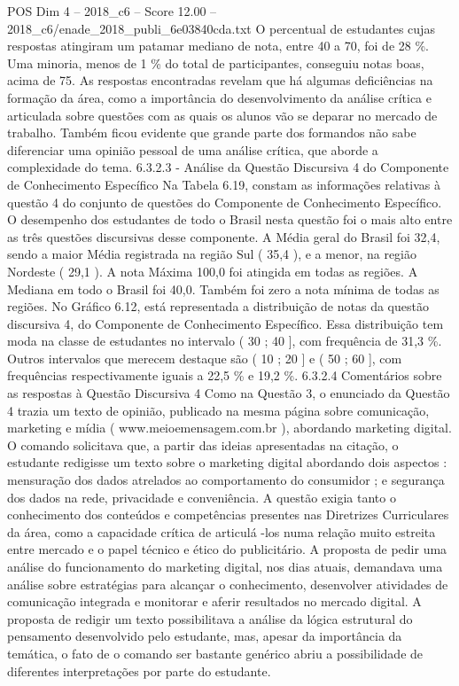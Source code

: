 \begin{textsample}{POS Dim 4 – 2018\_c6 – Score 12.00 – 2018\_c6/enade\_2018\_publi\_6e03840cda.txt}
O percentual de estudantes cujas respostas atingiram um patamar mediano de nota, entre 40 a 70, foi de 28 \%.
Uma minoria, menos de 1 \% do total de participantes, conseguiu notas boas, acima de 75.
As respostas encontradas revelam que há algumas deficiências na formação da área, como a importância do desenvolvimento da análise crítica e articulada sobre questões com as quais os alunos vão se deparar no mercado de trabalho.
Também ficou evidente que grande parte dos formandos não sabe diferenciar uma opinião pessoal de uma análise crítica, que aborde a complexidade do tema. 6.3.2.3 - Análise da Questão Discursiva 4 do Componente de Conhecimento Específico Na Tabela 6.19, constam as informações relativas à questão 4 do conjunto de questões do Componente de Conhecimento Específico.
O desempenho dos estudantes de todo o Brasil nesta questão foi o mais alto entre as três questões discursivas desse componente.
A Média geral do Brasil foi 32,4, sendo a maior Média registrada na região Sul ( 35,4 ), e a menor, na região Nordeste ( 29,1 ).
A nota Máxima 100,0 foi atingida em todas as regiões.
A Mediana em todo o Brasil foi 40,0.
Também foi zero a nota mínima de todas as regiões.
No Gráfico 6.12, está representada a distribuição de notas da questão discursiva 4, do Componente de Conhecimento Específico.
Essa distribuição tem moda na classe de estudantes no intervalo ( 30 ; 40 ], com frequência de 31,3 \%.
Outros intervalos que merecem destaque são ( 10 ; 20 ] e ( 50 ; 60 ], com frequências respectivamente iguais a 22,5 \% e 19,2 \%. 6.3.2.4 Comentários sobre as respostas à Questão Discursiva 4 Como na Questão 3, o enunciado da Questão 4 trazia um texto de opinião, publicado na mesma página sobre comunicação, marketing e mídia ( www.meioemensagem.com.br ), abordando marketing digital.
O comando solicitava que, a partir das ideias apresentadas na citação, o estudante redigisse um texto sobre o marketing digital abordando dois aspectos : mensuração dos dados atrelados ao comportamento do consumidor ; e segurança dos dados na rede, privacidade e conveniência.
A questão exigia tanto o conhecimento dos conteúdos e competências presentes nas Diretrizes Curriculares da área, como a capacidade crítica de articulá -los numa relação muito estreita entre mercado e o papel técnico e ético do publicitário.
A proposta de pedir uma análise do funcionamento do marketing digital, nos dias atuais, demandava uma análise sobre estratégias para alcançar o conhecimento, desenvolver atividades de comunicação integrada e monitorar e aferir resultados no mercado digital.
A proposta de redigir um texto possibilitava a análise da lógica estrutural do pensamento desenvolvido pelo estudante, mas, apesar da importância da temática, o fato de o comando ser bastante genérico abriu a possibilidade de diferentes interpretações por parte do estudante.

\end{textsample}
